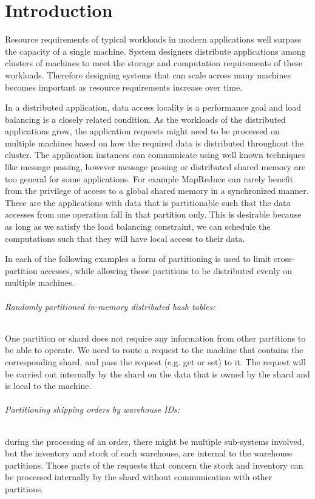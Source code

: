 \chapter{Introduction}
\label{chap:introduction}

Resource requirements of typical workloads in modern applications well surpass the
capacity of a single machine. System designers distribute applications among clusters of
machines to
meet the storage and computation requirements of these workloads. Therefore
designing systems that can scale across many machines becomes important as
resource requirements increase over time.

In a distributed application, data access locality is a performance goal
and load balancing is a closely related condition.
As the workloads of the distributed applications grow, the application
requests might need to be processed on multiple machines based on how the 
required data is distributed throughout the cluster. The application instances
can communicate using well known techniques like message passing, however
message passing or
distributed shared memory are too general for some applications. For example
MapReduce \cite{dean2008mapreduce} can rarely benefit from the privilege of
access to a global
shared memory in a synchronized manner. These are the applications with
data that is partitionable such that the data accesses from one operation
fall in that partition only. This is desirable because as long as we
satisfy the load balancing constraint, we can schedule the computations
such that they will have local access to their data.

In each of the following examples a form of partitioning is used to limit
cross-partition accesses, while allowing those partitions to be
distributed evenly on multiple machines.

        \subparagraph{Randomly partitioned in-memory distributed hash tables:} One partition or shard
    does not require any information from other partitions to be able to
    operate. We need to route a request to the machine that contains the
    corresponding shard,
    and pass the request (e.g. get or set) to it. The
    request will be carried out internally by the shard on the data that
    is owned by the shard and is local to the machine.

    \subparagraph{Partitioning shipping orders by warehouse IDs:} during the
    processing of an order, there might be multiple sub-systems involved,
    but the inventory and stock of each warehouse, are internal to
    the warehouse partitions. Those parts of the requests that concern the
    stock and inventory can be processed internally by the shard without
    communication with other partitions.

